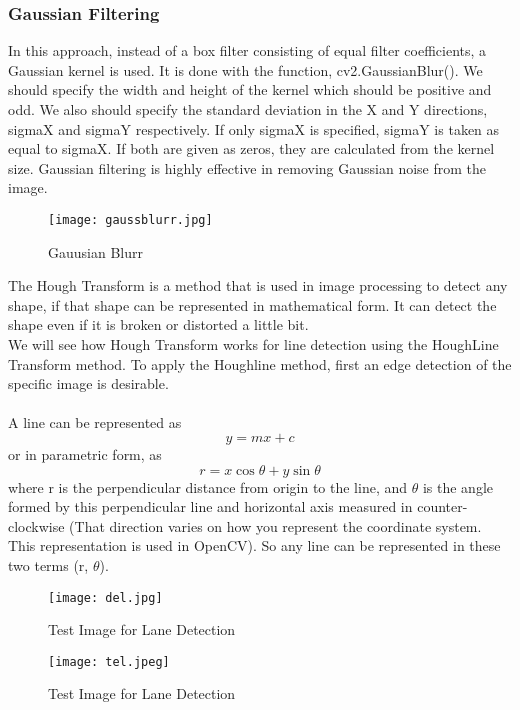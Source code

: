 \subsubsection{Gaussian Filtering}
In this approach, instead of a box filter consisting of equal filter coefficients, a Gaussian kernel is used. It is done with the function, cv2.GaussianBlur(). We should specify the width and height of the kernel which should be positive and odd. We also should specify the standard deviation in the X and Y directions, sigmaX and sigmaY respectively. If only sigmaX is specified, sigmaY is taken as equal to sigmaX. If both are given as zeros, they are calculated from the kernel size. Gaussian filtering is highly effective in removing Gaussian noise from the image.\\ 
\begin{figure}[H]
	\centering
	\texttt{[image: gaussblurr.jpg]}
	\caption{Gauusian Blurr}
\end{figure}
The Hough Transform is a method that is used in image processing to detect any shape, if that shape can be represented in mathematical form. It can detect the shape even if it is broken or distorted a little bit.\\
We will see how Hough Transform works for line detection using the HoughLine Transform method. To apply the Houghline method, first an edge detection of the specific image is desirable.\\ \\
A line can be represented as
\begin{equation} 
y = mx + c
\end{equation} or in parametric form, as
\begin{equation}
r = x\cos\theta + y\sin\theta
\end{equation}  
where r is the perpendicular distance from origin to the line, and $\theta$ is the angle formed by this perpendicular line and horizontal axis measured in counter-clockwise (That direction varies on how you represent the coordinate system. This representation is used in OpenCV). So any line can be represented in these two terms (r, $\theta$).
\begin{figure}[H]
	\centering
	\texttt{[image: del.jpg]}
	\caption{Test Image for Lane Detection}
\end{figure}

\begin{figure}[H]
	\centering
	\texttt{[image: tel.jpeg]}
	\caption{Test Image for Lane Detection}
\end{figure}



